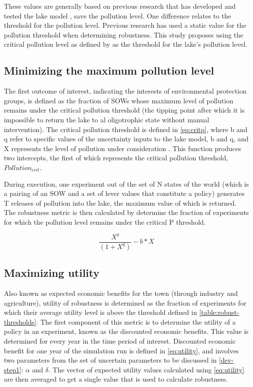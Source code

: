 These values are generally based on previous research that has developed and tested the lake model \citep{Quinn2017, Singh2015}, save the pollution level. One difference relates to the threshold for the pollution level. Previous research has used a static value for the pollution threshold when determining robustness. This study proposes using the critical pollution level as defined by \citet{Quinn2017} as the threshold for the lake's pollution level.

\subsection{Minimizing the maximum pollution level}
The first outcome of interest, indicating the interests of environmental protection groups, is defined as the fraction of SOWs whose maximum level of pollution remains under the critical pollution threshold (the tipping point after which it is impossible to return the lake to al oligotrophic state without manual intervention). The critical pollution threshold is defined in \cref{eq:critp}, where b and q refer to specific values of the uncertainty inputs to the lake model, b and q, and X represents the level of pollution under consideration \citep{Quinn2017}. This function produces two intercepts, the first of which represents the critical pollution threshold, $Pollution_{crit}$. 

During execution, one experiment out of the set of N states of the world (which is a pairing of an SOW and a set of lever values that constitute a policy) generates T releases of pollution into the lake, the maximum value of which is returned. The robustness metric is then calculated by determine the fraction of experiments for which the pollution level remains under the critical P threshold. 

\begin{equation}\label{eq:critp}
    \frac{X^{q}}{(1+X^{q})}-b*X
\end{equation}

\subsection{Maximizing utility}
Also known as expected economic benefits for the town (through industry and agriculture), utility of robustness is determined as the fraction of experiments for which their average utility level is above the threshold defined in \cref{table:robust-thresholds}. The first component of this metric is to determine the utility of a policy in an experiment, known as the discounted economic benefits. This value is determined for every year in the time period of interest. Discounted economic benefit for one year of the simulation run is defined in \cref{eq:utility}, and involves two parameters from the set of uncertain parameters to be discussed in \cref{dev-step1}: $\alpha$ and $\delta$. The vector of expected utility values calculated using \cref{eq:utility} are then averaged to get a single value that is used to calculate robustness. 

